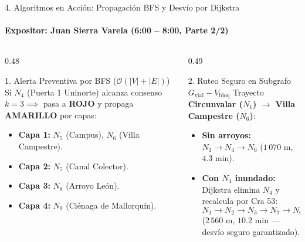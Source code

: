 \documentclass[aspectratio=169]{beamer}
\begin{document}
\begin{frame}{4. Algoritmos en Acción: Propagación BFS y Desvío por Dijkstra}
    \framesubtitle{Expositor: Juan Sierra Varela (6:00 -- 8:00, Parte 2/2)}
    \begin{columns}[T]
        \begin{column}{0.48\textwidth}
            \begin{block}{1. Alerta Preventiva por BFS ($\mathcal{O}(|V|+|E|)$)}
                Si $N_4$ (Puerta 1 Uninorte) alcanza consenso $k=3 \implies$ pasa a \textbf{ROJO} y propaga \textbf{AMARILLO} por capas:
                \begin{itemize}
                    \item \textbf{Capa 1:} $N_5$ (Campus), $N_6$ (Villa Campestre).
                    \item \textbf{Capa 2:} $N_7$ (Canal Colector).
                    \item \textbf{Capa 3:} $N_8$ (Arroyo León).
                    \item \textbf{Capa 4:} $N_9$ (Ciénaga de Mallorquín).
                \end{itemize}
            \end{block}
        \end{column}
        \begin{column}{0.49\textwidth}
            \begin{alertblock}{2. Ruteo Seguro en Subgrafo $G_{\text{vial}} - V_{\text{bloq}}$}
                Trayecto \textbf{Circunvalar ($N_1$) $\to$ Villa Campestre ($N_6$)}:
                \begin{itemize}
                    \item \textbf{Sin arroyos:} $N_1 \to N_4 \to N_6$ ($1\,070\text{ m}$, $4.3\text{ min}$).
                    \item \textbf{Con $N_4$ inundado:} Dijkstra elimina $N_4$ y recalcula por Cra 53:
                    \[
                        N_1 \to N_2 \to N_3 \to N_7 \to N_6
                    \]
                    ($2\,560\text{ m}$, $10.2\text{ min}$ --- desvío seguro garantizado).
                \end{itemize}
            \end{alertblock}
        \end{column}
    \end{columns}
\end{frame}
\end{document}
